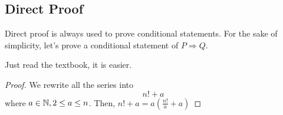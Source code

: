 \subsection{Direct Proof}
Direct proof is always used to prove conditional statements. 
For the sake of simplicity, let's prove a conditional statement of $P \Rightarrow Q$.

Just read the textbook, it is easier. 

\begin{proof}
    We rewrite all the series into 
    \[
        n! + a
    \]
    where $a \in \mathbb{N}, 2 \leq a \leq n$.
    Then, $n! + a = a\left( \frac{n!}{a} + a\right)$
\end{proof}